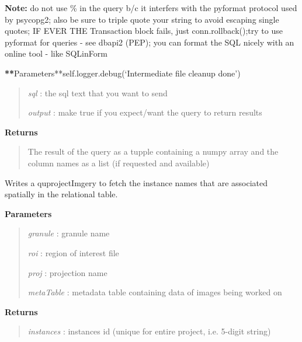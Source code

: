 \documentclass[letterpaper,10pt,openany,oneside]{sphinxmanual}
\begin{document}
\begin{fulllineitems}
\begin{fulllineitems}
\textbf{Note:} do not use \% in the query b/c it interfers with the pyformat protocol
used by psycopg2; also be sure to triple quote your string to avoid escaping single quotes;
IF EVER THE Transaction block fails, just conn.rollback();try to use pyformat for queries - see dbapi2 (PEP);
you can format the SQL nicely with an online tool - like SQLinForm

{\color{red}\bfseries{}**}Parameters**self.logger.debug(`Intermediate file cleanup done')
\begin{quote}

\emph{sql}    : the sql text that you want to send

\emph{output} : make true if you expect/want the query to return results
\end{quote}

\textbf{Returns}
\begin{quote}

The result of the query as a tupple containing a numpy array and the column names as a list (if requested and available)
\end{quote}

\end{fulllineitems}


\begin{fulllineitems}
\label{code:Database.Database.qryGetInstances}
Writes a quprojectImgery to fetch the instance names that are
associated spatially in the relational table.

\textbf{Parameters}
\begin{quote}

\emph{granule}    : granule name

\emph{roi}        : region of interest file

\emph{proj}       : projection name

\emph{metaTable}  : metadata table containing data of images being worked on
\end{quote}

\textbf{Returns}
\begin{quote}

\emph{instances}  : instances id (unique for entire project, i.e. 5-digit string)
\end{quote}

\end{fulllineitems}


\end{fulllineitems}
\end{document}
